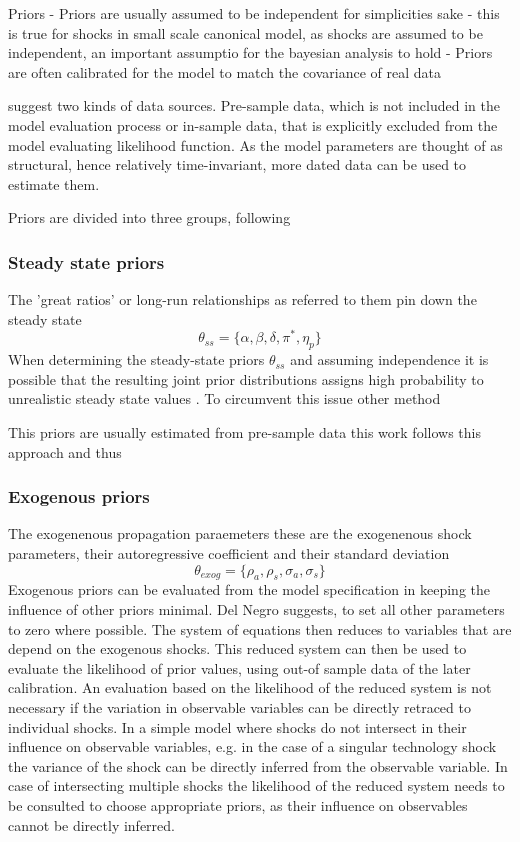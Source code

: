 \documentclass[12pt,a4paper,english]{article} %
\begin{document}
	Priors \cite{del_negro_forming_2008}
	- Priors are usually assumed to be independent for simplicities sake
	- this is true for shocks in small scale canonical model, as shocks are assumed to be independent, an important assumptio for the bayesian analysis to hold \cite{herbst_bayesian_2016}
	- Priors are often calibrated for the model to match the covariance of real data
		
	\cite{del_negro_forming_2008} suggest two kinds of data sources. Pre-sample data, which is not included in the model evaluation process or in-sample data, that is explicitly excluded from the model evaluating likelihood function.
	As the model parameters are thought of as structural, hence relatively time-invariant, more dated data can be used to estimate them. 
	
	Priors are divided into three groups, following \cite{del_negro_forming_2008}
	
	\subsubsection{Steady state priors}
	The 'great ratios' or long-run relationships as \cite{kydland_time_1982} referred to them pin down the steady state
	\[
		\theta_{ss} = \{\alpha, \beta, \delta, \pi^*, \eta_p\} %
	\]
	When determining the steady-state priors $\theta_{ss}$ and assuming independence it is possible that the resulting joint prior distributions assigns high probability to unrealistic steady state values \cite{del_negro_forming_2008}. To circumvent this issue other method
	
	This priors are usually estimated from pre-sample data \cite{herbst_bayesian_2016}
	this work follows this approach and thus 	
	
	\subsubsection{Exogenous priors}
	The exogenenous propagation paraemeters 
	these are the exogenenous shock parameters, their autoregressive coefficient and their standard deviation
	\[
		\theta_{exog} = \{\rho_a, \rho_s, \sigma_a, \sigma_s \}
	\]
	Exogenous priors can be evaluated from the model specification in keeping the influence of other priors minimal. Del Negro suggests, to set all other parameters to zero where possible. The system of equations then reduces to variables that are depend on the exogenous shocks. This reduced system can then be used to evaluate the likelihood of prior values, using out-of sample data of the later calibration. 
	An evaluation based on the likelihood of the reduced system is not necessary if the variation in observable variables can be directly retraced to individual shocks. In a simple model where shocks do not intersect in their influence on observable variables, e.g. in the case of a singular technology shock the variance of the shock can be directly inferred from the observable variable. In case of intersecting multiple shocks the likelihood of the reduced system needs to be consulted to choose appropriate priors, as their influence on observables cannot be directly inferred. 
	
\end{document}
